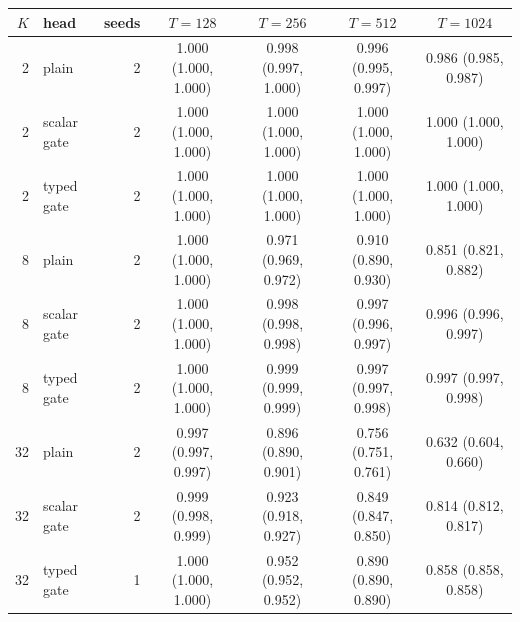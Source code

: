 \begin{tabular}{rlrcccc}
\toprule
$K$ & head & seeds & $T=128$ & $T=256$ & $T=512$ & $T=1024$ \\
\midrule
2 & plain & 2 & 1.000 (1.000, 1.000) & 0.998 (0.997, 1.000) & 0.996 (0.995, 0.997) & 0.986 (0.985, 0.987) \\
2 & scalar gate & 2 & 1.000 (1.000, 1.000) & 1.000 (1.000, 1.000) & 1.000 (1.000, 1.000) & 1.000 (1.000, 1.000) \\
2 & typed gate & 2 & 1.000 (1.000, 1.000) & 1.000 (1.000, 1.000) & 1.000 (1.000, 1.000) & 1.000 (1.000, 1.000) \\
8 & plain & 2 & 1.000 (1.000, 1.000) & 0.971 (0.969, 0.972) & 0.910 (0.890, 0.930) & 0.851 (0.821, 0.882) \\
8 & scalar gate & 2 & 1.000 (1.000, 1.000) & 0.998 (0.998, 0.998) & 0.997 (0.996, 0.997) & 0.996 (0.996, 0.997) \\
8 & typed gate & 2 & 1.000 (1.000, 1.000) & 0.999 (0.999, 0.999) & 0.997 (0.997, 0.998) & 0.997 (0.997, 0.998) \\
32 & plain & 2 & 0.997 (0.997, 0.997) & 0.896 (0.890, 0.901) & 0.756 (0.751, 0.761) & 0.632 (0.604, 0.660) \\
32 & scalar gate & 2 & 0.999 (0.998, 0.999) & 0.923 (0.918, 0.927) & 0.849 (0.847, 0.850) & 0.814 (0.812, 0.817) \\
32 & typed gate & 1 & 1.000 (1.000, 1.000) & 0.952 (0.952, 0.952) & 0.890 (0.890, 0.890) & 0.858 (0.858, 0.858) \\
\bottomrule
\end{tabular}
